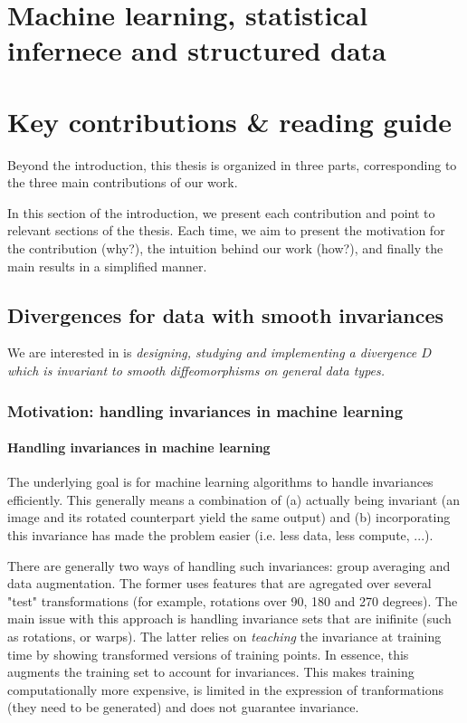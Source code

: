 
\section{Machine learning, statistical infernece and structured data}


\section{Key contributions \& reading guide}

Beyond the introduction, this thesis is organized in three parts, corresponding to the three main contributions of our work.

In this section of the introduction, we present each contribution and point to relevant sections of the thesis. Each time, we aim to present the motivation for the contribution (why?), the intuition behind our work (how?), and finally the main results in a simplified manner.

\newpage
\subsection{Divergences for data with smooth invariances}

We are interested in is \emph{designing, studying and implementing a divergence $D$ which is invariant to smooth diffeomorphisms on general data types.}

\subsubsection{Motivation: handling invariances in machine learning}

\paragraph{Handling invariances in machine learning}
The underlying goal is for machine learning algorithms to handle invariances efficiently. This generally means a combination of (a) actually being invariant (an image and its rotated counterpart yield the same output) and (b) incorporating this invariance has made the problem easier (i.e. less data, less compute, ...).

There are generally two ways of handling such invariances: group averaging and data augmentation. The former uses features that are agregated over several "test" transformations (for example, rotations over 90, 180 and 270 degrees). The main issue with this approach is handling invariance sets that are inifinite (such as rotations, or warps). The latter relies on \emph{teaching} the invariance at training time by showing transformed versions of training points. In essence, this augments the training set to account for invariances. This makes training computationally more expensive, is limited in the expression of tranformations (they need to be generated) and does not guarantee invariance.

